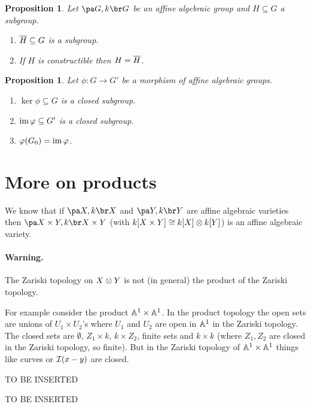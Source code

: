 \documentclass[12pt,a4paper]{scrartcl}
\theoremstyle{cplain}
\theoremstyle{cplain}
\theoremstyle{cplain}
\newtheorem{prop}[thmcounter]{Proposition}
\theoremstyle{definition}
\begin{document}
\begin{otherlanguage}{english}
\begin{prop}
  Let $\aav G$ be an affine algebraic group and $H \subseteq G$ a subgroup.
  \begin{enumerate}
  \item $\overline H \subseteq G$ is a subgroup.
  \item If $H$ is constructible then $H = \overline H$.
  \end{enumerate}
\end{prop}

\begin{prop}
  Let $\phi\colon G \to G'$ be a morphism of affine algebraic groups.
  \begin{enumerate}
  \item $\ker\phi \subseteq G$ is a closed subgroup.
  \item $\operatorname{im} \varphi \subseteq G'$ is a closed subgroup.
  \item $\varphi(G_0) = \operatorname{im} \varphi$.
  \end{enumerate}
\end{prop}

\section{More on products}
We know that if $\aav X$ and $\aav Y$ are affine algebraic varieties then $\aav{X\times Y}$ (with $k[X \times Y] \cong k[X]\otimes k[Y]$) is an affine algebraic variety.

\paragraph{Warning.}
The Zariski topology on $X \otimes Y$ is not (in general) the product of the Zariski topology.

For example consider the product $\mathbb A^1\times\mathbb A^1$. In the product topology the open sets are unions of $U_1 \times U_2$'s where $U_1$ and $U_2$ are open in $\mathbb A^1$ in the Zariski topology. The closed sets are $\emptyset$, $Z_1\times k$, $k \times Z_2$, finite sets and $k \times k$ (where $Z_1,Z_2$ are closed in the Zariski topology, so finite). But in the Zariski topology of $\mathbb A^1\times\mathbb A^1$ things like curves or $\mathcal{I}(x-y)$ are closed.


TO BE INSERTED


TO BE INSERTED


\end{otherlanguage}
\end{document}
